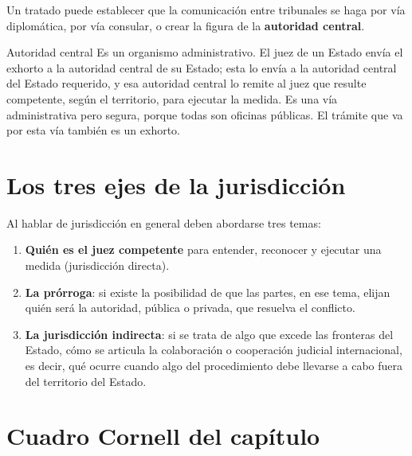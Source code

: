 \documentclass[12pt,oneside]{book}
\begin{document}
Un tratado puede establecer que la comunicación entre tribunales se haga por vía diplomática, por vía consular, o crear la figura de la \textbf{autoridad central}.

\begin{definition}{Autoridad central}
Es un organismo administrativo. El juez de un Estado envía el exhorto a la autoridad central de su Estado; esta lo envía a la autoridad central del Estado requerido, y esa autoridad central lo remite al juez que resulte competente, según el territorio, para ejecutar la medida. Es una vía administrativa pero segura, porque todas son oficinas públicas. El trámite que va por esta vía también es un exhorto.
\end{definition}

\section{Los tres ejes de la jurisdicción}

Al hablar de jurisdicción en general deben abordarse tres temas:

\begin{enumerate}
    \item \textbf{Quién es el juez competente} para entender, reconocer y ejecutar una medida (jurisdicción directa).
    \item \textbf{La prórroga}: si existe la posibilidad de que las partes, en ese tema, elijan quién será la autoridad, pública o privada, que resuelva el conflicto.
    \item \textbf{La jurisdicción indirecta}: si se trata de algo que excede las fronteras del Estado, cómo se articula la colaboración o cooperación judicial internacional, es decir, qué ocurre cuando algo del procedimiento debe llevarse a cabo fuera del territorio del Estado.
\end{enumerate}

\section{Cuadro Cornell del capítulo}
\end{document}
